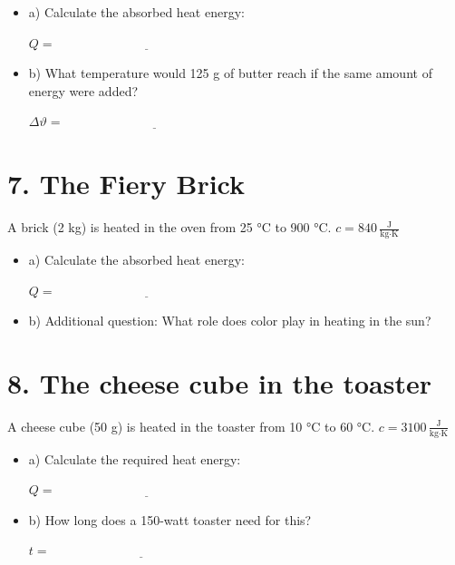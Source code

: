 \documentclass[a4paper]{article}
\begin{document}
	\begin{itemize}
		\item a) Calculate the absorbed heat energy:
		
		\vspace{1em}
		\( Q = \underline{\hspace{6cm}} \)
		
		\item b) What temperature would 125 g of butter reach if the same amount of energy were added?
		
		\vspace{1em}
		\( \Delta \vartheta = \underline{\hspace{6cm}} \)
	\end{itemize}
	
	\hrulefill
	
	\section*{7. The Fiery Brick }
	
	A brick (2 kg) is heated in the oven from 25 °C to 900 °C.
	\( c = 840\, \frac{\text{J}}{\text{kg}\cdot\text{K}} \)
	
	\begin{itemize}
		\item a) Calculate the absorbed heat energy:
		
		\vspace{1em}
		\( Q = \underline{\hspace{6cm}} \)
		
		\item b) Additional question: What role does color play in heating in the sun?
		
		\vspace{1em}
		\underline{\hspace{12cm}}
	\end{itemize}
	
	\hrulefill
	
\section*{8. The cheese cube in the toaster }

A cheese cube (50 g) is heated in the toaster from 10 °C to 60 °C.
\( c = 3100\, \frac{\text{J}}{\text{kg}\cdot\text{K}} \)

\begin{itemize}
	\item a) Calculate the required heat energy:
	
	\vspace{1em}
	\( Q = \underline{\hspace{6cm}} \)
	
	\item b) How long does a 150-watt toaster need for this?
	
	\vspace{1em}
	\( t = \underline{\hspace{6cm}} \)
\end{itemize}
\end{document}
